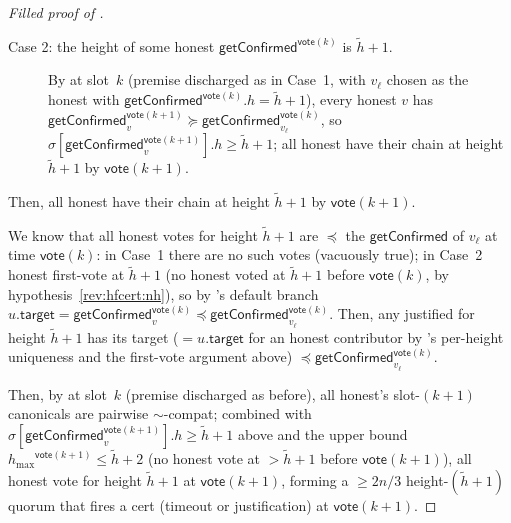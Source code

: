 \ifx\litemode\undefined\documentclass{article}\fi
\newcommand{\target}{\mathsf{target}}
\newcommand{\hmax}{\ensuremath{h_{\max}}\xspace}
\newcommand{\vote}{\ensuremath{\mathsf{vote}}}
\newcommand{\comm}[1]{\ensuremath{\widetilde{#1}}}
\newcommand{\getConfirmed}{\textsf{getConfirmed}\xspace}
\theoremstyle{plain}
\theoremstyle{definition}
\theoremstyle{remark}
\begin{document}
\begin{proof}[Filled proof of ]
\begin{description}
  \item[Case 2: the height of some honest $\getConfirmed^{\vote(k)}$ is $\comm{h}+1$.]
  By  at slot~$k$ (premise discharged as in Case~1, with $v_\ell$ chosen as the honest with $\getConfirmed^{\vote(k)}.h = \comm{h}+1$), every honest $v$ has $\getConfirmed_v^{\vote(k+1)} \succeq \getConfirmed_{v_\ell}^{\vote(k)}$, so $\sigma[\getConfirmed_v^{\vote(k+1)}].h \geq \comm{h}+1$;
  all honest have their chain at height $\comm{h}+1$ by $\vote(k+1)$.
\end{description}

Then, all honest have their chain at height $\comm{h}+1$ by $\vote(k+1)$.

We know that all honest votes for height $\comm{h}+1$ are $\preceq$ the $\getConfirmed$ of $v_\ell$ at time $\vote(k)$:
in Case~1 there are no such votes (vacuously true);
in Case~2 honest first-vote at $\comm{h}+1$ (no honest voted at $\comm{h}+1$ before $\vote(k)$, by hypothesis~\ref{rev:hfcert:nh}), so by 's default branch $u.\target = \getConfirmed_v^{\vote(k)} \preceq \getConfirmed_{v_\ell}^{\vote(k)}$.
Then, any justified for height $\comm{h}+1$ has its target ($= u.\target$ for an honest contributor by 's per-height uniqueness and the first-vote argument above) $\preceq \getConfirmed_{v_\ell}^{\vote(k)}$.

Then, by  at slot~$k$ (premise discharged as before), all honest's slot-$(k+1)$ canonicals are pairwise $\sim$-compat;
combined with $\sigma[\getConfirmed_v^{\vote(k+1)}].h \geq \comm{h}+1$ above and the upper bound $\hmax^{\vote(k+1)} \leq \comm{h}+2$ (no honest vote at $> \comm{h}+1$ before $\vote(k+1)$), all honest vote for height $\comm{h}+1$ at $\vote(k+1)$, forming a $\geq 2n/3$ height-$(\comm{h}+1)$ quorum that fires a cert (timeout or justification) at $\vote(k+1)$.


\end{proof}
\end{document}

